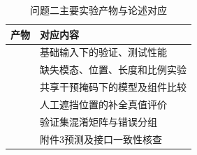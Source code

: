 \begin{table}[htbp]\centering\small
\caption{问题二主要实验产物与论述对应}
\begin{tabularx}{\linewidth}{p{5.4cm}Y}\toprule
产物 & 对应内容\\\midrule
{} & 基础输入下的验证、测试性能\\
 & 缺失模态、位置、长度和比例实验\\
 & 共享干预掩码下的模型及组件比较\\
 & 人工遮挡位置的补全真值评价\\
 & 验证集混淆矩阵与错误分组\\
 & 附件3预测及接口一致性核查\\\bottomrule
\end{tabularx}\end{table}

